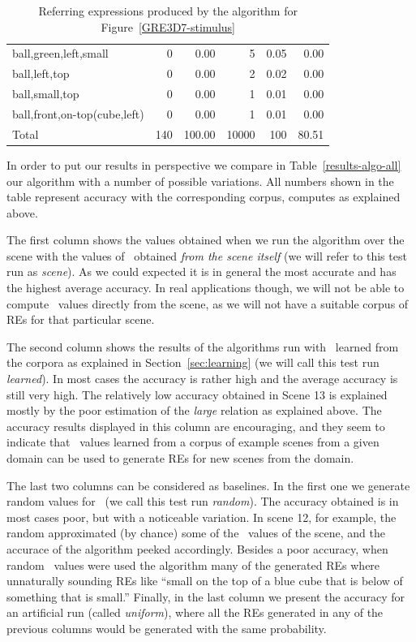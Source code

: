 \begin{table}[h!]
\begin{center}
\begin{tabular}{|l|r|r|r|r|r|}
ball,green,left,small                         &  0 &  0.00 &    5 &  0.05 &  0.00\\
ball,left,top                                 &  0 &  0.00 &    2 &  0.02 &  0.00\\
ball,small,top                                &  0 &  0.00 &    1 &  0.01 &  0.00\\
ball,front,on-top(cube,left)                  &  0 &  0.00 &    1 &  0.01 &  0.00\\
\hline
Total & 140 & 100.00 & 10000 & 100 & 80.51 \\
\hline
\end{tabular}
\caption{Referring expressions produced by the algorithm for Figure~\ref{GRE3D7-stimulus}\label{results-algo-fig3}}
\end{center}
\end{table}

In order to put our results in perspective we compare in Table~\ref{results-algo-all} 
our algorithm with a number of possible variations.  All numbers shown in the table 
represent accuracy with the corresponding corpus, computes as explained above. 
 
The first column shows the values obtained when we run the algorithm over the scene
with the values of \puse\ obtained \emph{from the scene itself} (we will refer to this
test run as \emph{scene}).  As we could expected
it is in general the most accurate and has the highest average accuracy. In real 
applications though, we will not be able to compute \puse\ values directly from the 
scene, as we will not have a suitable corpus of REs for that particular scene. 

The second column shows the results of the algorithms run with \puse\ learned from the 
corpora as explained in Section~\ref{sec:learning} (we will call this test run \emph{learned}).  In most cases the accuracy 
is rather high and the average accuracy is still very high. The relatively low accuracy 
obtained in Scene 13 is explained mostly by the poor estimation of the \emph{large} 
relation as explained above.  The accuracy results displayed in this column are 
encouraging, and they seem to indicate that \puse\ values learned from a corpus of example 
scenes from a given domain can be used to generate REs for new scenes from the domain. 

The last two columns can be considered as baselines. In the first one we generate 
random values for \puse\ (we call this test run \emph{random}).  The accuracy obtained is in most cases poor, but with 
a noticeable variation. In scene 12, for example, the random \puse approximated 
(by chance) some of the \puse\ values of the scene, and the accurace of the algorithm 
peeked accordingly.  Besides a poor accuracy, when random \puse\ values were used the 
algorithm many of the generated REs where unnaturally sounding REs like ``small 
on the top of a blue cube that is below of something that is small.'' Finally, 
in the last column we present the accuracy for an artificial run (called \emph{uniform}), where all the 
REs generated in any of the previous columns would be generated with the same 
probability. 


